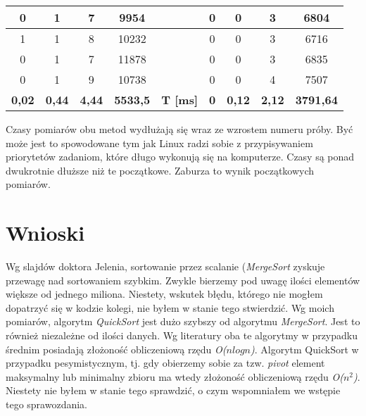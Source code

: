 \documentclass[11pt,a4paper]{article}
\begin{document}
\begin{table}[htbp]
\begin{center}
\begin{tabular}{|c|c|c|c|c|c|c|c|c|}
0 & 1 & 7 & 9954 &  & 0 & 0 & 3 & 6804 \\ \hline
1 & 1 & 8 & 10232 &  & 0 & 0 & 3 & 6716 \\ \hline
0 & 1 & 7 & 11878 &  & 0 & 0 & 3 & 6835 \\ \hline
0 & 1 & 9 & 10738 &  & 0 & 0 & 4 & 7507 \\ \hline
\textbf{0,02} & \textbf{0,44} & \textbf{4,44} & \textbf{5533,5} & \textbf{T [ms]} & \textbf{0} & \textbf{0,12} & \textbf{2,12} & \textbf{3791,64} \\ \hline
\end{tabular}
\end{center}
\label{Wyniki2}
\end{table}

\newpage


Czasy pomiarów obu metod wydłużają się wraz ze wzrostem numeru próby. Być może jest to spowodowane tym jak Linux radzi sobie z przypisywaniem priorytetów zadaniom, które długo wykonują się na komputerze. Czasy są ponad dwukrotnie dłuższe niż te początkowe. Zaburza to wynik początkowych pomiarów.

\bigskip
\section{Wnioski}
\hspace{4ex}Wg slajdów doktora Jelenia, sortowanie przez scalanie (\textit{MergeSort} zyskuje przewagę nad sortowaniem szybkim. Zwykle bierzemy pod uwagę ilości elementów większe od jednego miliona. Niestety, wskutek błędu, którego nie mogłem dopatrzyć się w kodzie kolegi, nie byłem w stanie tego stwierdzić. Wg moich pomiarów, algorytm \textit{QuickSort} jest dużo szybszy od algorytmu \textit{MergeSort}. Jest to również niezależne od ilości danych. Wg literatury oba te algorytmy w przypadku średnim posiadają złożoność obliczeniową rzędu \textit{O($nlogn$)}. Algorytm QuickSort w przypadku pesymistycznym, tj. gdy obierzemy sobie za tzw. \textit{pivot} element maksymalny lub minimalny zbioru ma wtedy złożoność obliczeniową rzędu \textit{O($n^2$)}. Niestety nie byłem w stanie tego sprawdzić, o czym wspomniałem we wstępie tego sprawozdania.
\end{document}
